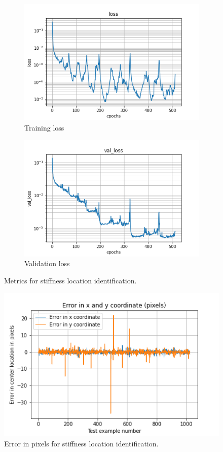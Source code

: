 \documentclass{article}
\begin{document}
%
\begin{figure}
\centering
\begin{subfigure}[b]{0.45\textwidth}
    \centering
    \includegraphics[totalheight=4cm]{circle_id/location/plotloss.png}
    \caption{Training loss}
  \end{subfigure}
%
\begin{subfigure}[b]{0.45\textwidth}
    \centering
    \includegraphics[totalheight=4cm]{circle_id/location/plotval_loss.png}
    \caption{Validation loss}
  \end{subfigure}
%
\caption{\label{fig:locationmetrics} Metrics for stiffness location identification.}
\end{figure}
%
\begin{figure}
\centering
\includegraphics{circle_id/location/plotabserror.png}
\caption{\label{fig:locationerror} Error in pixels for stiffness location identification.}
\end{figure}
%
\end{document}
